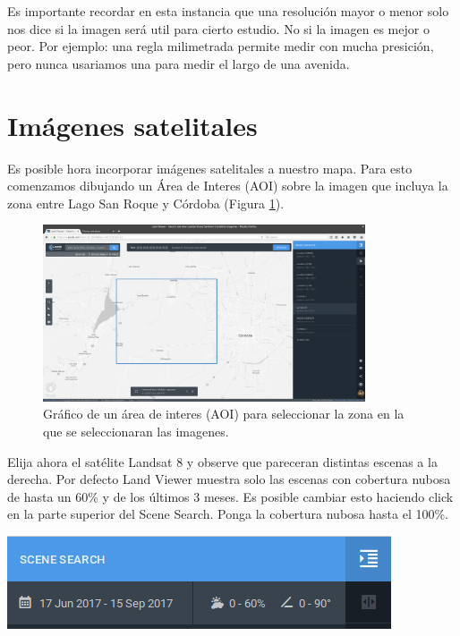 \documentclass[a4paper,12pt]{book}
\begin{document}
Es importante recordar en esta instancia que una resolución mayor o menor solo nos dice si la imagen será util para cierto estudio. No si la imagen es mejor o peor. Por ejemplo: una regla milimetrada permite medir con mucha presición, pero nunca usariamos una para medir el largo de una avenida.


\section{Imágenes satelitales}
Es posible hora incorporar imágenes satelitales a nuestro mapa. Para esto comenzamos dibujando un Área de Interes (AOI) sobre la imagen que incluya la zona entre Lago San Roque y Córdoba (Figura \ref{fig:aoi}).

\begin{figure}[h!]
    \centering
    \includegraphics[width=0.85\textwidth]{fig:aoi.png}
    \caption{Gráfico de un área de interes (AOI) para seleccionar la zona en la que se seleccionaran las imagenes.}
    \label{fig:aoi}
\end{figure}

Elija ahora el satélite Landsat 8 y observe que pareceran distintas escenas a la derecha. Por defecto Land Viewer muestra solo las escenas con cobertura nubosa de hasta un 60\% y de los últimos 3 meses. Es posible cambiar esto haciendo click en la parte superior del Scene Search.  Ponga la cobertura nubosa hasta el 100\%.

\begin{center}\includegraphics[scale=0.4]{in:nubes.png}\end{center}
\end{document}
